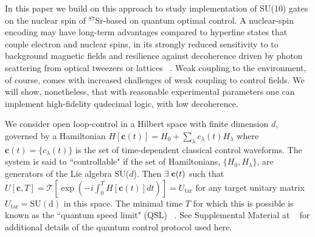 \documentclass[aps,prl,twocolumn,reprint,superscriptaddress,footinbib]{revtex4-2}
\begin{document}
In this paper we build on this approach to study implementation of SU(10) gates on the nuclear spin of $^{87}$Sr-based on quantum optimal control. A nuclear-spin encoding may have long-term advantages compared to hyperfine states that couple electron and nuclear spins, in its strongly reduced sensitivity to to background magnetic fields and resilience against decoherence driven by photon scattering from optical tweezers or lattices ~\cite{hayes2007quantum, dorscher2018lattice}.  Weak coupling to the environment, of course, comes with increased challenges of weak coupling to control fields.  We will show, nonetheless, that with reasonable experimental parameters one can implement high-fidelity qudecimal logic, with low decoherence.

We consider open loop-control in a Hilbert space with finite dimension $d$, governed by a Hamiltonian $H[\mathbf{c}(t)] = H_0 + \sum_\lambda c_\lambda(t) H_\lambda$ where $\mathbf{c}(t)=\{c_\lambda(t)\}$ is the set of time-dependent classical control waveforms. The system is said to ``controllable" if the set of Hamiltonians, $\{H_0, H_\lambda\}$, are generators of the Lie algebra SU($d$).  Then $\exists \hspace{0.1cm} \mathbf{c}(t)$ \hspace{0.2cm } such that $U[\mathbf{c},T]=\mathcal{T}\left[\exp\left(-i\int_0^T H[\mathbf{c}(t)]dt\right)\right]=U_{\mathrm{tar} }$ for any target unitary matrix $U_{\mathrm{tar} }=\mathrm{SU(d)}$ in this space.  The minimal time $T$ for which this is possible is known as the ``quantum speed limit" (QSL)~\cite{caneva2009optimal} . See Supplemental Material at ~\cite{notes1} for additional details of the quantum control protocol used here.
\end{document}
